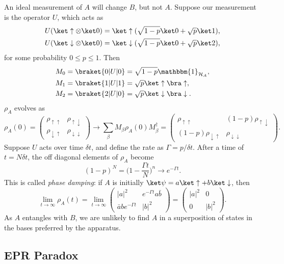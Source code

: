 \documentclass[12pt]{article}
\begin{document}
An ideal measurement of $A$ will change $B$, but not $A$. Suppose our measurement is the operator $U$, which acts as
\begin{align*}
	U(\ket \uparrow \otimes \ket 0) &= \ket \uparrow ( \sqrt{1 - p} \ket 0 + \sqrt{p} \ket 1), \\
	U(\ket \downarrow \otimes \ket 0) &= \ket \downarrow(\sqrt{1 - p} \ket 0 + \sqrt p \ket 2),
\end{align*}
for some probability $0 \leq p \leq 1$. Then
\begin{align*}
	M_0 &= \braket{0|U|0} = \sqrt{1 - p} \mathbbm{1}_{\mathcal{H}_A}, \\
	M_1 &= \braket{1|U|1} = \sqrt p \ket \uparrow \bra \uparrow, \\
	M_2 &= \braket{2|U|0} = \sqrt p \ket \downarrow \bra \downarrow.
\end{align*}
$\rho_A$ evolves as
\[
\rho_A(0) =
\begin{pmatrix}
	\rho_{\uparrow \uparrow} & \rho_{\uparrow \downarrow} \\
	\rho_{\downarrow \uparrow} & \rho_{\downarrow \downarrow}
\end{pmatrix}
\to \sum_{\beta} M_\beta \rho_A(0) M_\beta^{\dagger} =
\begin{pmatrix}
	\rho_{\uparrow \uparrow} & (1 - p)\rho_{\uparrow \downarrow} \\
	(1-p) \rho_{\downarrow \uparrow} & \rho_{\downarrow \downarrow}
\end{pmatrix}.
\]
Suppose $U$ acts over time $\delta t$, and define the rate as $\Gamma = p/\delta t$. After a time of $t = N \delta t$, the off diagonal elements of $\rho_A$ become
\[
	(1 - p)^N = \biggl(1 - \frac{\Gamma t}{N} \biggr)^n \to e^{- \Gamma t}.
\]
This is called \emph{phase damping}: if $A$ is initially $\ket \psi = a \ket \uparrow + b \ket \downarrow$, then
\[
\lim_{t \to \infty} \rho_A(t) = \lim_{t \to \infty}
\begin{pmatrix}
	|a|^2 & e^{- \Gamma t} a \bar b \\
	\bar a b e^{-\Gamma t} & |b|^2
\end{pmatrix} =
\begin{pmatrix}
	|a|^2 & 0 \\ 0 & |b|^2
\end{pmatrix}.
\]
As $A$ entangles with $B$, we are unlikely to find $A$ in a superposition of states in the bases preferred by the apparatus.

\subsection{EPR Paradox}
\label{sub:epr_paradox}
\end{document}
